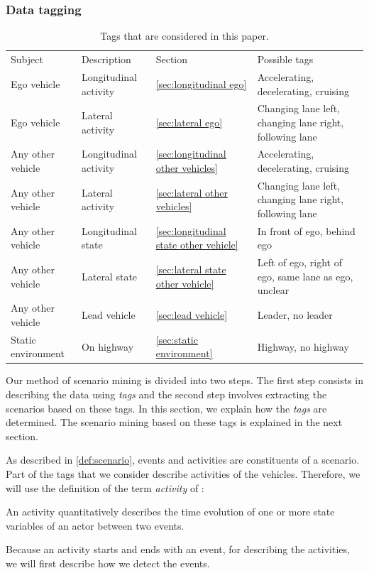 \subsubsection{Data tagging}
\label{sec:tagging}

\begin{table}
	\centering
	\caption{Tags that are considered in this paper.}
	\label{tab:tags}
	\begin{tabular}{llll}
		\toprule
		Subject & Description & Section & Possible tags \\ \otoprule
		Ego vehicle & Longitudinal activity & \cref{sec:longitudinal ego} & Accelerating, decelerating, cruising \\
		Ego vehicle & Lateral activity & \cref{sec:lateral ego} & Changing lane left, changing lane right, following lane \\
		Any other vehicle & Longitudinal activity & \cref{sec:longitudinal other vehicles} & Accelerating, decelerating, cruising \\
		Any other vehicle & Lateral activity & \cref{sec:lateral other vehicles} & Changing lane left, changing lane right, following lane \\
		Any other vehicle & Longitudinal state & \cref{sec:longitudinal state other vehicle} & In front of ego, behind ego \\
		Any other vehicle & Lateral state & \cref{sec:lateral state other vehicle} & Left of ego, right of ego, same lane as ego, unclear \\
		Any other vehicle & Lead vehicle & \cref{sec:lead vehicle} & Leader, no leader \\
		Static environment & On highway & \cref{sec:static environment} & Highway, no highway \\ 
		\bottomrule
	\end{tabular}
\end{table}

Our method of scenario mining is divided into two steps. 
The first step consists in describing the data using \emph{tags} and the second step involves extracting the scenarios based on these tags. 
In this section, we explain how the \emph{tags} are determined. 
The scenario mining based on these tags is explained in the next section.

As described in \cref{def:scenario}, events and activities are constituents of a scenario. 
Part of the tags that we consider describe activities of the vehicles.
Therefore, we will use the definition of the term \emph{activity} of \autocite{degelder2018ontology}:
\begin{definition}[Activity]
	\label{def:activity}
	An activity quantitatively describes the time evolution of one or more state variables of an actor between two events.
\end{definition}
Because an activity starts and ends with an event, for describing the activities, we will first describe how we detect the events.

